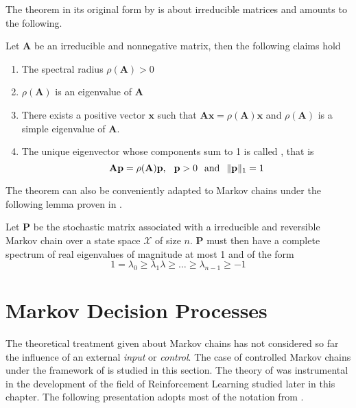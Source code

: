 The theorem in its original form by \cite{Horn1986} is about irreducible matrices and amounts to the following. 

\begin{thm}

Let $\mathbf{A}$ be an irreducible and nonnegative matrix, then the following claims hold
\begin{enumerate}
\item The spectral radius $\rho(\mathbf{A})  > 0$
\item $\rho(\mathbf{A})$ is an eigenvalue of $\mathbf{A}$
\item There exists a positive vector $\mathbf{x}$ such that $\mathbf{A}\mathbf{x} = \rho(\mathbf{A})\mathbf{x}$ and $\rho(\mathbf{A})$ is a simple eigenvalue of $\mathbf{A}$.
\item The unique eigenvector whose components sum to 1 is called , that is
\begin{equation}
\mathbf{A} \mathbf{p} = \rho(\mathbf{A}) \mathbf{p}, \hspace{2.5mm} \mathbf{p} > 0 \hspace{2.5mm} \mbox{and} \hspace{2.5mm} \|\mathbf{p}\|_1 = 1
\end{equation}
\end{enumerate}
\end{thm}

The theorem can also be conveniently adapted to Markov chains under the following
lemma proven in \cite{Montenegro2006}.
\begin{lem}
Let $\mathbf{P}$ be the stochastic matrix associated with a irreducible and reversible 
Markov chain over a state space $\mathcal{X}$ of size $n$. $\mathbf{P}$ must then
have a complete spectrum of real eigenvalues of magnitude at most 1 and of the form
\begin{equation}
1 = \lambda_0 \geq \lambda_1 \lambda \geq \dots \geq \lambda_{n-1} \geq -1
\end{equation}
\end{lem}

\section{Markov Decision Processes}
\label{sec:mdp}
The theoretical treatment given about Markov chains has not considered so far the influence of an external \textit{input} or \textit{control}. The case of controlled Markov chains under the framework of \mdps is studied in this section. The theory of \mdps was instrumental in the development of the field of Reinforcement Learning studied later in this chapter. The following presentation adopts most of the notation from \cite{Csaba2010}. 

